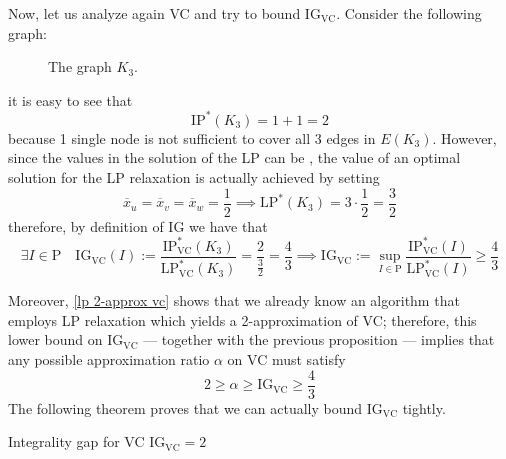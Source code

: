 \documentclass[a4paper, 12pt]{report}
\begin{document}

    Now, let us analyze again VC and try to bound $\mathrm{IG_{VC}}$. Consider the following  graph:
    
    \begin{figure}[H]
        \centering
        \caption{The graph $K_3$.}
    \end{figure}

    it is easy to see that $$\mathrm{IP^*}(K_3) = 1 + 1 = 2$$ because 1 single node is not sufficient to cover all 3 edges in $E(K_3)$. However, since the values in the solution of the LP can be , the value of an optimal solution for the LP relaxation is actually achieved by setting $$\overline x_u = \overline x_v = \overline x_w = \dfrac{1}{2} \implies \mathrm{LP}^*(K_3) = 3 \cdot \dfrac{1}{2} = \dfrac{3}{2}$$ therefore, by definition of IG we have that $$\exists I \in \mathrm P \quad \mathrm{IG_{VC}}(I) := \dfrac{\mathrm{IP^*_{VC}}(K_3)}{\mathrm{LP^*_{VC}}(K_3)} = \dfrac{2}{\tfrac{3}{2}} = \dfrac{4}{3} \implies \mathrm{IG_{VC}} := \sup_{I \in \mathrm P}{\dfrac{\mathrm{IP^*_{VC}}(I)}{\mathrm{LP^*_{VC}}(I)}} \ge \dfrac{4}{3}$$ 

    Moreover, \cref{lp 2-approx vc} shows that we already know an algorithm that employs LP relaxation which yields a 2-approximation of VC; therefore, this lower bound on $\mathrm{IG_{VC}}$ --- together with the previous proposition --- implies that any possible approximation ratio $\alpha$ on VC must satisfy $$2 \ge \alpha \ge \mathrm{IG_{VC}} \ge \dfrac{4}{3}$$ The following theorem proves that we can actually bound $\mathrm{IG_{VC}}$ tightly.

    \begin{framedthm}{Integrality gap for VC}
        $\mathrm{IG_{VC}} = 2$
    \end{framedthm}
\end{document}
